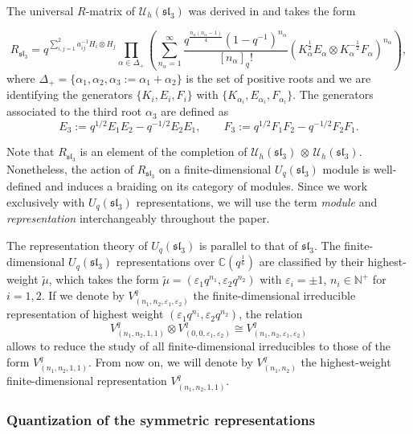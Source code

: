 \documentclass[12pt,oneside,reqno]{amsart}
\def\N{\mathbb{N}}
\def\C{\mathbb{C}}
\numberwithin{teorema}{section}
\numberwithin{definicion}{section}
\numberwithin{lema}{section}
\numberwithin{conjetura}{section}
\numberwithin{proposicion}{section}
\def\sl{\mathfrak{sl}}
\def\Uh{\mathcal{U}_h}
\def\Uq{U_q}
\begin{document}
The universal $R$-matrix of $\Uh(\sl_3)$ was derived in \cite{Bur} and takes the form

\begin{equation}\label{eq:Bur-formula}
    R_{\sl_3} = q^{\sum_{i,j=1}^2 a_{ij}^{-1} H_i\otimes H_j} \prod_{\alpha\in\Delta_+} \left(\sum_{n_\alpha=1}^\infty \frac{q^\frac{n_\alpha(n_\alpha-1)}{4}(1-q^{-1})^{n_\alpha}}{[n_\alpha]_q!} \left(K_\alpha^\frac{1}{2}E_\alpha\otimes K_\alpha^{-\frac{1}{2}}F_\alpha\right)^{n_\alpha} \right),
\end{equation}
where $\Delta_+=\{\alpha_1,\alpha_2,\alpha_3:=\alpha_1+\alpha_2\}$ is the set of positive roots and we are identifying the generators $\{K_i,E_i,F_i\}$ with $\{K_{\alpha_i},E_{\alpha_i},F_{\alpha_i}\}$. The generators associated to the third root $\alpha_3$ are defined as
\begin{equation*}
    E_3:=q^{1/2}E_1E_2-q^{-1/2}E_2E_1, \hspace{2em} F_3:=q^{1/2}F_1F_2-q^{-1/2}F_2F_1.
\end{equation*}

Note that $R_{\sl_3}$ is an element of the completion of $\Uh(\sl_3)\,\otimes\,\Uh(\sl_3)$. Nonetheless, the action of $R_{\sl_3}$ on a finite-dimensional $\Uq(\sl_3)$ module is well-defined and induces a braiding on its category of modules. Since we work exclusively with $\Uq(\sl_3)$ representations, we will use the term \textit{module} and \textit{representation} interchangeably throughout the paper.

The representation theory of $\Uq(\sl_3)$ is parallel to that of $\sl_3$. The finite-dimensional $\Uq(\sl_3)$ representations over $\C(q^\frac16)$ are classified by their highest-weight $\widetilde{\mu}$, which takes the form $\widetilde{\mu} = (\varepsilon_1 q^{n_1},\varepsilon_2 q^{n_2})$ with $\varepsilon_i=\pm 1$, $n_i\in\N^+$ for $i=1,2$. 
If we denote by $V^q_{(n_1,n_2,\varepsilon_1,\varepsilon_2)}$ the finite-dimensional irreducible representation of highest weight $(\varepsilon_1 q^{n_1},\varepsilon_2 q^{n_2})$, the relation $$V^q_{(n_1,n_2,1,1)}\otimes V^q_{(0,0,\varepsilon_1,\varepsilon_2)} \cong V^q_{(n_1,n_2,\varepsilon_1,\varepsilon_2)}$$ allows to reduce the study of all finite-dimensional irreducibles to those of the form $V^q_{(n_1,n_2, 1, 1)}$. From now on, we will denote by $V^q_{(n_1,n_2)}$ the highest-weight finite-dimensional representation $V^q_{(n_1,n_2, 1, 1)}$.

\subsubsection{Quantization of the symmetric representations}
\end{document}
